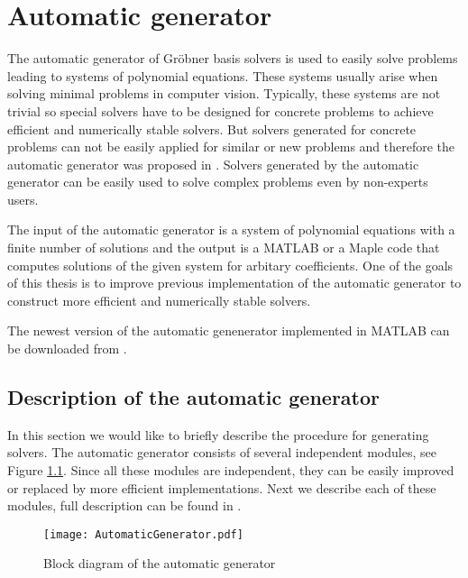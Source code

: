 \chapter{Automatic generator}
The automatic generator of Gr\"obner basis solvers is used to easily solve problems leading to systems of polynomial equations. These systems usually arise when solving minimal problems \cite{MinimalProblems} in computer vision. Typically, these systems are not trivial so special solvers have to be designed for concrete problems to achieve efficient and numerically stable solvers. But solvers generated for concrete problems can not be easily applied for similar or new problems and therefore the automatic generator was proposed in \cite{AutoGen}. Solvers generated by the automatic generator can be easily used to solve complex problems even by non-experts users.

The input of the automatic generator is a system of polynomial equations with a finite number of solutions and the output is a MATLAB or a Maple code that computes solutions of the given system for arbitary coefficients. One of the goals of this thesis is to improve previous implementation \cite{AutoGen} of the automatic generator to construct more efficient and numerically stable solvers.

The newest version of the automatic genenerator implemented in MATLAB can be downloaded from \cite{AutomaticGenerator}.

\section{Description of the automatic generator}
In this section we would like to briefly describe the procedure for generating solvers. The automatic generator consists of several independent modules, see Figure \ref{autogen:blockDiagram}. Since all these modules are independent, they can be easily improved or replaced by more efficient implementations. Next we describe each of these modules, full description can be found in \cite{AutoGen, KukelovaAlgMethods}.

\begin{figure}[ht]
  \centering
  \texttt{[image: AutomaticGenerator.pdf]}
  \caption{Block diagram of the automatic generator}
  \label{autogen:blockDiagram}
\end{figure}

